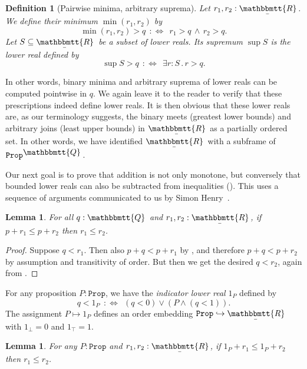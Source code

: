 \documentclass[reqno,11pt]{amsproc}
\theoremstyle{plain}
\newtheorem{lemma}[theorem]{Lemma}
\newtheorem{definition}[theorem]{Definition}
\theoremstyle{definition}
\newcommand{\Const}[1]{\mathtt{#1}}
\newcommand{\ubar}[1]{\underaccent{\bar}{#1}}
\newcommand{\ind}[1]{1_{#1}}			%
\newcommand{\internal}[1]{\raisebox{-.03ex}{$\mathbbmtt{#1}$}}
\newcommand{\hs}{\hspace{1pt}}
\newcommand{\tqq}{\internal{Q}\hs}
\newcommand{\trr}{\internal{R}}
\newcommand{\tlrr}{\ubar{\trr}\hs}
\newcommand{\prop}{\Const{Prop}}
\renewcommand{\iff}{\Leftrightarrow}
\newcommand{\beq}{\begin{equation}}
\newcommand{\eeq}{\end{equation}}
\numberwithin{equation}{section}
\begin{document}
\begin{definition}[Pairwise minima, arbitrary suprema]\label{def.min_sup}
Let $r_1,r_2:\tlrr$. We define their \emph{minimum} $\min(r_1,r_2)$ by
\[
	\min(r_1, r_2) > q \:\::\iff\:\: r_1 > q \,\wedge\, r_2 > q.
\]
Let $S \subseteq \tlrr$ be a subset of lower reals.
Its \emph{supremum} $\sup S$ is the lower real defined  by 
\[
	\sup S > q \:\::\iff\:\: \exists r : S \,.\, r > q.
\]
\end{definition}

In other words, binary minima and arbitrary suprema of lower reals can be computed pointwise in $q$. We again leave it to the reader to verify that these prescriptions indeed define lower reals. It is then obvious that these lower reals are, as our terminology suggests, the binary meets (greatest lower bounds) and arbitrary joins (least upper bounds) in $\tlrr$ as a partially ordered set. In other words, we have identified $\tlrr$ with a subframe of $\prop^{\tqq}$.

Our next goal is to prove that addition is not only monotone, but conversely that bounded lower reals can also be subtracted from inequalities (). This uses a sequence of arguments communicated to us by Simon Henry~\cite{henry2012simplification}.

\begin{lemma}
	\label{cancel_rationals}
	For all $q:\tqq$ and $r_1,r_2:\tlrr$, if $p + r_1\le p + r_2$ then $r_1 \le r_2$.
\end{lemma}

\begin{proof}
	Suppose $q < r_1$. Then also $p + q < p + r_1$ by , and therefore $p + q < p + r_2$ by assumption and transitivity of order. But then we get the desired $q < r_2$, again from .
\end{proof}

For any proposition $P : \prop$, we have the \emph{indicator lower real} $\ind{P}$ defined by
\beq
	\label{indicator_lower_real}
	q < 1_P \:\::\iff\:\: (q < 0) \lor (P \land (q < 1)).
\eeq
The assignment $P \mapsto \ind{P}$ defines an order embedding $\prop \hookrightarrow \tlrr$ with $\ind{\bot} = 0$ and $\ind{\top} = 1$.

\begin{lemma}\label{order_cancel_props}
For any $P:\prop$ and $r_1,r_2:\tlrr$, if $\ind{P}+r_1\le \ind{P}+r_2$ then $r_1\le r_2$.
\end{lemma}
\end{document}
